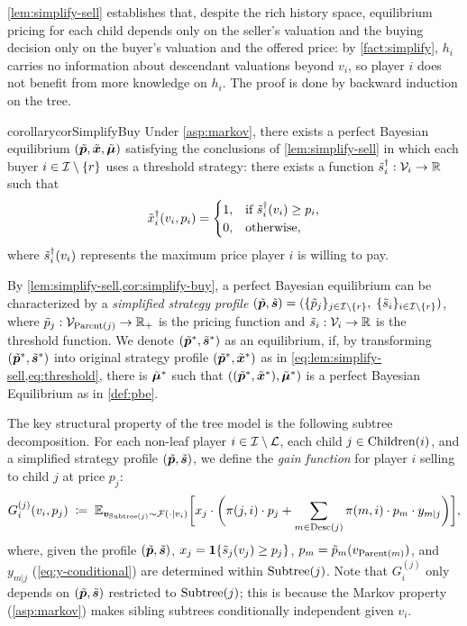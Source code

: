 \cref{lem:simplify-sell} establishes that, despite the rich history space, equilibrium pricing for each child depends only on the seller's valuation and the buying decision only on the buyer's valuation and the offered price: by \cref{fact:simplify}, $h_i$ carries no information about descendant valuations beyond $v_i$, so player $i$ does not benefit from more knowledge on $h_i$.
The proof is done by backward induction on the tree.

\begin{restatable}{corollary}{corSimplifyBuy}
\label{cor:simplify-buy}
Under \cref{asp:markov}, there exists a perfect Bayesian equilibrium $(\tilde{{\bm{p}}}, \tilde{{\bm{x}}}, {\tilde{{\bm{\mu}}}})$ satisfying the conclusions of \cref{lem:simplify-sell} in which each buyer $i \in \mathcal{I} \setminus \{r\}$ uses a threshold strategy: there exists a function $\tilde{s}^\dagger_i: \mathcal{V}_i \to \mathbb{R}$ such that
\begin{equation}
\label{eq:threshold}
\tilde{x}^\dagger_i(v_i, p_i) =
\begin{cases}
1, & \text{if } \tilde{s}^\dagger_i(v_i) \ge p_i, \\
0, & \text{otherwise,}
\end{cases}
\end{equation}
where $\tilde{s}^\dagger_i(v_i)$ represents the maximum price player $i$ is willing to pay.
\end{restatable}

By \cref{lem:simplify-sell,cor:simplify-buy}, a perfect Bayesian equilibrium can be characterized by a \emph{simplified strategy profile} $(\tilde{{\bm{p}}}, \tilde{{\bm{s}}}) = (\{\tilde{p}_j\}_{j \in \mathcal{I} \setminus \{r\}},\; \{\tilde{s}_i\}_{i \in \mathcal{I} \setminus \{r\}})$, where $\tilde{p}_j: \mathcal{V}_{\operatorname{Parent}(j)} \to \mathbb{R}_+$ is the pricing function and $\tilde{s}_i: \mathcal{V}_i \to \mathbb{R}$ is the threshold function. We denote $(\tilde{{\bm{p}}}^*, \tilde{{\bm{s}}}^*)$ as an equilibrium, if, by transforming $(\tilde{{\bm{p}}}^*, \tilde{{\bm{s}}}^*)$ into original strategy profile $(\tilde{{\bm{p}}}^*, \tilde{{\bm{x}}}^*)$ as in \cref{eq:lem:simplify-sell,eq:threshold}, there is ${\tilde{{\bm{\mu}}}}^*$ such that $((\tilde{{\bm{p}}}^*, \tilde{{\bm{x}}}^*), {\tilde{{\bm{\mu}}}}^*)$ is a perfect Bayesian Equilibrium as in \cref{def:pbe}.

The key structural property of the tree model is the following subtree decomposition. For each non-leaf player $i \in \mathcal{I} \setminus \mathcal{L}$, each child $j \in \operatorname{Children}(i)$, and a simplified strategy profile $(\tilde{{\bm{p}}}, \tilde{{\bm{s}}})$, we define the \emph{gain function} for player $i$ selling to child $j$ at price $p_j$:
\begin{equation}
\label{eq:gain-child}
G^{(j)}_i(v_i, p_j) \;\coloneqq\; \mathbb{E}_{{\bm{v}}_{\operatorname{Subtree}(j)} \sim \mathcal{F}(\cdot|v_i)} \bigg[ x_j \cdot \bigg(\pi(j,i)\cdot p_j + \sum_{m \in \operatorname{Desc}(j)} \pi(m,i) \cdot p_m \cdot y_{m \mid j} \bigg)\bigg],
\end{equation}
where, given the profile $(\tilde{{\bm{p}}}, \tilde{{\bm{s}}})$, $x_j = \bm{1}\{\tilde{s}_j(v_j) \ge p_j\}$, $p_m = \tilde{p}_m(v_{\operatorname{Parent}(m)})$, and $y_{m|j}$ (\cref{eq:y-conditional}) are determined within $\operatorname{Subtree}(j)$. Note that $G^{(j)}_i$ only depends on $(\tilde{{\bm{p}}}, \tilde{{\bm{s}}})$ restricted to $\operatorname{Subtree}(j)$; this is because the Markov property (\cref{asp:markov}) makes sibling subtrees conditionally independent given $v_i$.

